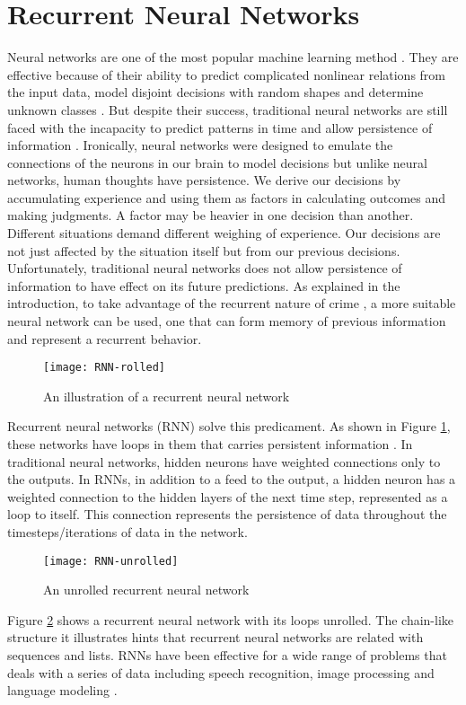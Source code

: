 \section{Recurrent Neural Networks}
    Neural networks are one of the most popular machine learning method \citep{razi2005comparative}. They are effective because of their ability to predict complicated nonlinear relations from the input data, model disjoint decisions with random shapes and determine unknown classes \citep{huang2006real}. But despite their success, traditional neural networks are still faced with the incapacity to predict patterns in time and allow persistence of information \citep{patan2008artificial}. Ironically, neural networks were designed to emulate the connections of the neurons in our brain to model decisions but unlike neural networks, human thoughts have persistence. We derive our decisions by accumulating experience and using them as factors in calculating outcomes and making judgments. A factor may be heavier in one decision than another. Different situations demand different weighing of experience. Our decisions are not just affected by the situation itself but from our previous decisions. Unfortunately, traditional neural networks does not allow persistence of information to have effect on its future predictions. As explained in the introduction, to take advantage of the recurrent nature of crime \citep{perc2013understanding}, a more suitable neural network can be used, one that can form memory of previous information and represent a recurrent behavior.

    \begin{figure}[H]
    \centering
    \texttt{[image: RNN-rolled]}
    \caption{An illustration of a recurrent neural network \citep{olah2015understanding}}
    \label{fig:rnn-rolled}
    \end{figure}
    Recurrent neural networks (RNN) solve this predicament. As shown in Figure \ref{fig:rnn-rolled}, these networks have loops in them that carries persistent information \citep{mikolov2010recurrent}. In traditional neural networks, hidden neurons have weighted connections only to the outputs. In RNNs, in addition to a feed to the output, a hidden neuron has a weighted connection to the hidden layers of the next time step, represented as a loop to itself. This connection represents the persistence of data throughout the timesteps/iterations of data in the network.

    \begin{figure}[H]
    \centering
    \texttt{[image: RNN-unrolled]}
    \caption{An unrolled recurrent neural network \citep{olah2015understanding}}
    \label{fig:rnn-unrolled}
    \end{figure}
    Figure \ref{fig:rnn-unrolled} shows a recurrent neural network with its loops unrolled. The chain-like structure it illustrates hints that recurrent neural networks are related with sequences and lists. RNNs have been effective for a wide range of problems that deals with a series of data including speech recognition, image processing and language modeling \citep{olah2015understanding}.

